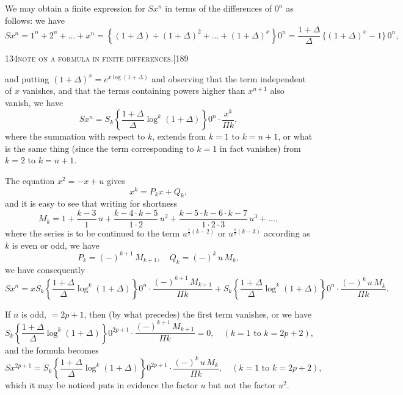 \documentclass[11pt]{article}
\begin{document}
We may obtain a finite expression for $Sx^{n}$ in terms of the differences of $0^{n}$ as follows: we have
\[
Sx^{n} = 1^{n} + 2^{n} + \ldots + x^{n} = \left\{(1+\Delta) + (1+\Delta)^{2} + \ldots + (1+\Delta)^{x}\right\}\!0^{n} = \frac{1+\Delta}{\Delta}\,\{(1+\Delta)^{x} - 1\}\,0^{n},
\]

\newpage

\begin{center}
\small 134\hfill\textsc{note on a formula in finite differences.}\hfill[189
\end{center}

\medskip

\noindent and putting $(1+\Delta)^{x} = e^{x\log(1+\Delta)}$ and observing that the term independent of $x$ vanishes, and that the terms containing powers higher than $x^{n+1}$ also vanish, we have
\[
Sx^{n} = S_{k}\left\{\frac{1+\Delta}{\Delta}\log^{k}(1+\Delta)\right\}0^{n}\cdot\frac{x^{k}}{\Pi k},
\]
where the summation with respect to $k$, extends from $k = 1$ to $k = n + 1$, or what is the same thing (since the term corresponding to $k = 1$ in fact vanishes) from $k = 2$ to $k = n + 1$.

The equation $x^{2} = -x + u$ gives
\[
x^{k} = P_{k} x + Q_{k},
\]
and it is easy to see that writing for shortness
\[
M_{k} = 1 + \frac{k-3}{1}\,u + \frac{k-4\cdot k-5}{1\cdot 2}\,u^{2} + \frac{k-5\cdot k-6\cdot k-7}{1\cdot 2\cdot 3}\,u^{3} + \ldots,
\]
where the series is to be continued to the term $u^{\frac{1}{2}(k-2)}$ or $u^{\frac{1}{2}(k-3)}$ according as $k$ is even or odd, we have
\[
P_{k} = (-)^{k+1}\,M_{k+1}, \quad Q_{k} = (-)^{k}\,u\,M_{k},
\]
we have consequently
\[
Sx^{n} = x S_{k}\left\{\frac{1+\Delta}{\Delta}\log^{k}(1+\Delta)\right\}0^{n}\cdot\frac{(-)^{k+1}\,M_{k+1}}{\Pi k}
+ S_{k}\left\{\frac{1+\Delta}{\Delta}\log^{k}(1+\Delta)\right\}0^{n}\cdot\frac{(-)^{k}\,u\,M_{k}}{\Pi k}.
\]

If $n$ is odd, $= 2p + 1$, then (by what precedes) the first term vanishes, or we have
\[
S_{k}\left\{\frac{1+\Delta}{\Delta}\log^{k}(1+\Delta)\right\}0^{2p+1}\cdot\frac{(-)^{k+1}\,M_{k+1}}{\Pi k} = 0,\quad (k = 1 \text{ to } k = 2p + 2),
\]
and the formula becomes
\[
Sx^{2p+1} = S_{k}\left\{\frac{1+\Delta}{\Delta}\log^{k}(1+\Delta)\right\}0^{2p+1}\cdot\frac{(-)^{k}\,u\,M_{k}}{\Pi k},\quad (k = 1 \text{ to } k = 2p + 2),
\]
which it may be noticed puts in evidence the factor $u$ but not the factor $u^{2}$.
\end{document}
